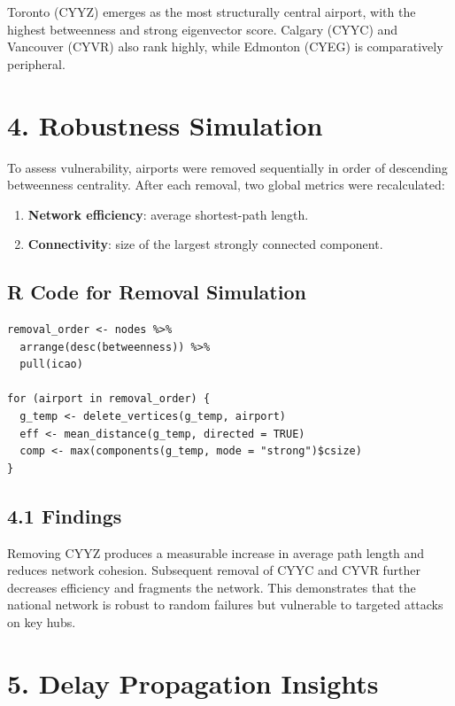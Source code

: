 \documentclass[10pt]{article}
\begin{document}
Toronto (CYYZ) emerges as the most structurally central airport, with the highest betweenness and strong eigenvector score. Calgary (CYYC) and Vancouver (CYVR) also rank highly, while Edmonton (CYEG) is comparatively peripheral.

\section*{4. Robustness Simulation}

To assess vulnerability, airports were removed sequentially in order of descending betweenness centrality. After each removal, two global metrics were recalculated:

\begin{enumerate}[label=\arabic*.]
    \item \textbf{Network efficiency}: average shortest-path length.
    \item \textbf{Connectivity}: size of the largest strongly connected component.
\end{enumerate}

\subsection*{R Code for Removal Simulation}

\begin{verbatim}
removal_order <- nodes %>%
  arrange(desc(betweenness)) %>%
  pull(icao)

for (airport in removal_order) {
  g_temp <- delete_vertices(g_temp, airport)
  eff <- mean_distance(g_temp, directed = TRUE)
  comp <- max(components(g_temp, mode = "strong")$csize)
}
\end{verbatim}

\subsection*{4.1 Findings}

Removing CYYZ produces a measurable increase in average path length and reduces network cohesion. Subsequent removal of CYYC and CYVR further decreases efficiency and fragments the network. This demonstrates that the national network is robust to random failures but vulnerable to targeted attacks on key hubs.

\section*{5. Delay Propagation Insights}
\end{document}
